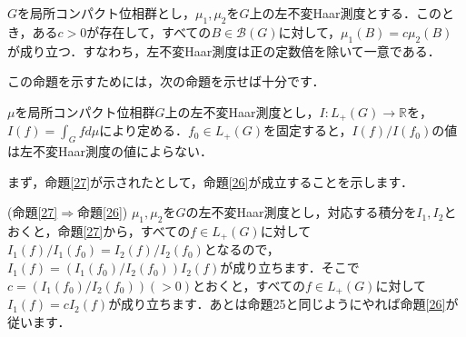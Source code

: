 \begin{prop}\label{26}
$G$を局所コンパクト位相群とし，$\mu_1, \mu_2$を$G$上の左不変Haar測度とする．このとき，ある$c>0$が存在して，すべての$B \in \mathscr{B}(G)$に対して，$\mu_1(B)=c\mu_2(B)$が成り立つ．すなわち，左不変Haar測度は正の定数倍を除いて一意である．
\end{prop}
この命題を示すためには，次の命題を示せば十分です．
\begin{prop}\label{27}
$\mu$を局所コンパクト位相群$G$上の左不変Haar測度とし，$I \colon L_{+}(G) \to \mathbb{R}$を，$I(f)=\int_{G}f d\mu$により定める．$f_0 \in L_{+}(G)$を固定すると，$I(f)/I(f_0)$の値は左不変Haar測度の値によらない．
\end{prop}
まず，命題\ref{27}が示されたとして，命題\ref{26}が成立することを示します．
\begin{Proof}(命題\ref{27}$\Rightarrow$命題\ref{26}) $\mu_1, \mu_2$を$G$の左不変Haar測度とし，対応する積分を$I_1, I_2$とおくと，命題\ref{27}から，すべての$f \in L_{+}(G)$に対して$I_{1}(f)/I_{1}(f_0)=I_{2}(f)/I_{2}(f_0)$となるので，$I_{1}(f)= \left( I_{1}(f_0)/I_{2}(f_{0}) \right) I_{2}(f)$が成り立ちます．そこで$c=\left( I_{1}(f_0)/I_{2}(f_{0}) \right)(>0)$とおくと，すべての$f \in L_{+}(G)$に対して$I_{1}(f)= c I_{2}(f)$が成り立ちます．あとは命題25と同じようにやれば命題\ref{26}が従います．
\end{Proof}

